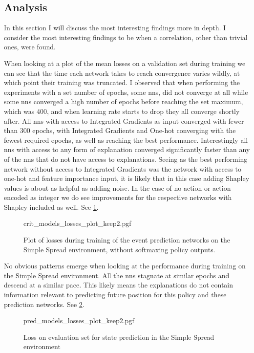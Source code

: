 \documentclass[UKenglish]{uiomasterthesis}
\begin{document}
\subsection{Analysis}
In this section I will discuss the most interesting findings more in depth. I consider the most interesting findings to be when a correlation, other than trivial ones, were found.


When looking at a plot of the mean losses on a validation set during training we can see that the time each network takes to reach convergence varies wildly, at which point their training was truncated. I observed that when performing the experiments with a set number of epochs, some \acp{nn}, did not converge at all while some \acp{nn} converged a high number of epochs before reaching the set maximum, which was 400, and when learning rate starts to drop they all converge shortly after. All \acp{nn} with access to Integrated Gradients as input converged with fewer than 300 epochs, with Integrated Gradients and One-hot converging with the fewest required epochs, as well as reaching the best performance. Interestingly all \acp{nn} with access to any form of explanation converged significantly faster than any of the \acp{nn} that do not have access to explanations. Seeing as the best performing network without access to Integrated Gradients was the network with access to one-hot and feature importance input, it is likely that in this case adding Shapley values is about as helpful as adding noise. In the case of no action or action encoded as integer we do see improvements for the respective networks with Shapley included as well. See \cref{fig:crit_losses_log}.

\begin{figure}[hbtp]
    \centering
    {crit_models_losses_plot_keep2.pgf}
    \caption{Plot of losses during training of the event prediction networks on the Simple Spread environment, without softmaxing policy outputs.}
	\label{fig:crit_losses_log}
\end{figure}

No obvious patterns emerge when looking at the performance during training on the Simple Spread environment. All the \acp{nn} stagnate at similar epochs and descend at a similar pace. This likely means the explanations do not contain information relevant to predicting future position for this policy and these prediction networks. See \cref{fig:pred_losses}.

\begin{figure}[hbtp]
    \centering
    {pred_models_losses_plot_keep2.pgf}
    \caption{Loss on evaluation set for state prediction in the Simple Spread environment}
	\label{fig:pred_losses}
\end{figure}
\end{document}
